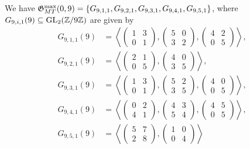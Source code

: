 We have $\mathfrak{G}_{MT}^{\max}(0,9) = \{ G_{9,1,1}, G_{9,2,1}, G_{9,3,1}, G_{9,4,1}, G_{9,5,1} \}$, where $G_{9,i,1}(9) \subseteq \operatorname{GL}_2(\mathbb{Z}/9\mathbb{Z})$ are given by
\[
\begin{split}
G_{9,1,1}(9) &= \left\langle \begin{pmatrix} 1 & 3 \\ 0 & 1 \end{pmatrix}, \begin{pmatrix} 5 & 0 \\ 3 & 2 \end{pmatrix}, \begin{pmatrix} 4 & 2 \\ 0 & 5 \end{pmatrix} \right\rangle, \\
G_{9,2,1}(9) &= \left\langle \begin{pmatrix} 2 & 1 \\ 0 & 5 \end{pmatrix}, \begin{pmatrix} 4 & 0 \\ 3 & 5 \end{pmatrix} \right\rangle, \\
G_{9,3,1}(9) &= \left\langle \begin{pmatrix} 1 & 3 \\ 0 & 1 \end{pmatrix}, \begin{pmatrix} 5 & 2 \\ 3 & 5 \end{pmatrix}, \begin{pmatrix} 4 & 0 \\ 0 & 5 \end{pmatrix} \right\rangle, \\
G_{9,4,1}(9) &= \left\langle \begin{pmatrix} 0 & 2 \\ 4 & 1 \end{pmatrix}, \begin{pmatrix} 4 & 3 \\ 5 & 4 \end{pmatrix}, \begin{pmatrix} 4 & 5 \\ 0 & 5 \end{pmatrix} \right\rangle, \\
G_{9,5,1}(9) &= \left\langle \begin{pmatrix} 5 & 7 \\ 2 & 8 \end{pmatrix}, \begin{pmatrix} 1 & 0 \\ 0 & 4 \end{pmatrix} \right\rangle
\end{split}
\]
